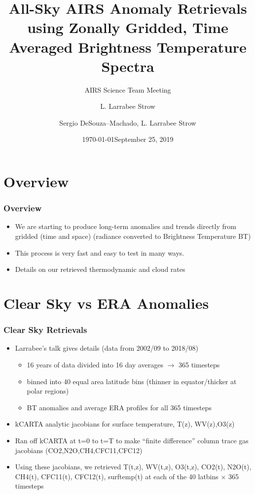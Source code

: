 \documentclass[10pt,t]{beamer}
\author{L. Larrabee Strow}
\date{\today}
\title{\large All-Sky AIRS Anomaly Retrievals \newline
  using Zonally Gridded, Time Averaged \newline
  Brightness Temperature Spectra}
\subtitle{\footnotesize{AIRS Science Team Meeting}}
\date{\vspace{0.1in}\footnotesize{September 25, 2019 \vfill}}
\author{Sergio DeSouza--Machado\inst{1,2}, L. Larrabee Strow\inst{1,2}}
\institute[UMBC]{\inst{1} UMBC Physics Dept. \and \inst{2}UMBC JCET}
\begin{document}
\maketitle
{}

\section{Overview}
\begin{frame}
  \frametitle{Overview}
  \begin{itemize}
  \item We are starting to produce long-term anomalies and trends directly from gridded (time and space)
        (radiance converted to Brightness Temperature BT)
  \item This process is very fast and easy to test in many ways.
  \item Details on our retrieved thermodynamic and cloud rates
  \end{itemize}
\end{frame}

\section{Clear Sky vs ERA Anomalies}
\begin{frame}
  \frametitle{Clear Sky Retrievals}
  \begin{itemize}
    \item Larrabee's talk gives details (data from 2002/09 to 2018/08)
      \begin{itemize}
        \item 16 years of data divided into 16 day averages $\rightarrow$ 365 timesteps
        \item binned into 40 equal area latitude bins (thinner in equator/thicker at polar regions)
        \item BT anomalies and average ERA profiles for all 365 timesteps
      \end{itemize}
    \item kCARTA analytic jacobians for surface temperature, T(z), WV(z),O3(z)
    \item Ran off kCARTA at t=0 to t=T to make ``finite difference'' column trace gas jacobians
          (CO2,N2O,CH4,CFC11,CFC12)
    \item Using these jacobians, we retrieved T(t,z), WV(t,z), O3(t,z), CO2(t), N2O(t), CH4(t), 
          CFC11(t), CFC12(t), surftemp(t)
          at each of the 40 latbins $\times $ 365 timesteps
  \end{itemize}
\end{frame}
\end{document}
